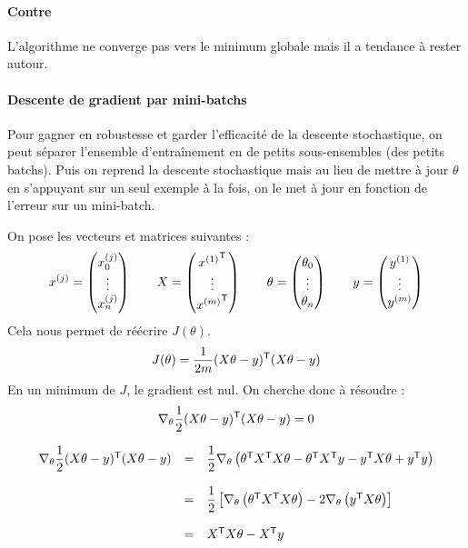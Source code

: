 \paragraph{Contre}
L'algorithme ne converge pas vers le minimum globale mais il a tendance à rester autour.

\paragraph{Descente de gradient par mini-batchs}
Pour gagner en robustesse et garder l'efficacité de la descente stochastique, on peut séparer l'ensemble d'entraînement en de petits sous-ensembles (des petits batchs). Puis on reprend la descente stochastique mais au lieu de mettre à jour $\theta$ en s'appuyant sur un seul exemple à la fois, on le met à jour en fonction de l'erreur sur un mini-batch.


On pose les vecteurs et matrices suivantes :
$$ x^{(j)} = \begin{pmatrix} x_0^{(j)} \\ \vdots \\ x_n^{(j)} \end{pmatrix} \qquad
X = \begin{pmatrix} {x^{(1)}}^{\mathsf{T}} \\ \vdots \\ {x^{(m)}}^{\mathsf{T}} \end{pmatrix} \qquad 
\theta = \begin{pmatrix} \theta_0 \\ \vdots \\ \theta_n \end{pmatrix} \qquad
y = \begin{pmatrix} y^{(1)} \\ \vdots \\ y^{(m)} \end{pmatrix} $$
Cela nous permet de réécrire $J(\theta)$.
$$ J(\theta) = \dfrac{1}{2m} (X\theta - y)^{\mathsf{T}} (X\theta - y) $$
En un minimum de $J$, le gradient est nul. On cherche donc à résoudre :
$$ \nabla_\theta \dfrac{1}{2} (X\theta - y)^{\mathsf{T}} (X\theta - y) = 0 $$
\newpage

$$ \begin{array}{lll}
\nabla_\theta \dfrac{1}{2} (X\theta - y)^{\mathsf{T}} (X\theta - y)
& = & \dfrac{1}{2} \nabla_\theta \left( \theta^{\mathsf{T}} X^{\mathsf{T}} X \theta - \theta^{\mathsf{T}} X^{\mathsf{T}} y - y^{\mathsf{T}} X \theta + y^{\mathsf{T}} y \right) \\ \\
& = & \dfrac{1}{2} \left[ \nabla_\theta \left(\theta^{\mathsf{T}} X^{\mathsf{T}} X \theta \right) - 2 \nabla_\theta \left( y^{\mathsf{T}} X \theta \right) \right] \\ \\
& = & X^{\mathsf{T}} X \theta - X^{\mathsf{T}} y
\end{array} $$

